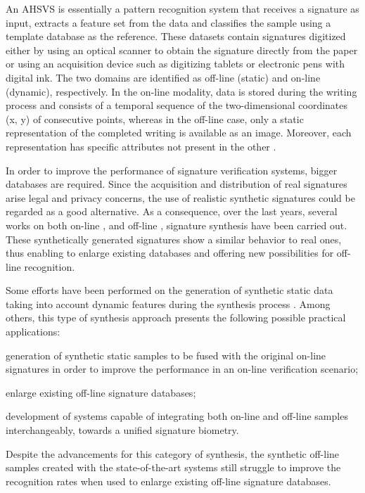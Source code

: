 An AHSVS is essentially a pattern recognition system that receives a signature as input, extracts a feature set from the data and classifies the sample using a template database as the reference. These datasets contain signatures digitized either by using an optical scanner to obtain the signature directly from the paper or using an acquisition device such as digitizing tablets or electronic pens with digital ink. The two domains are identified as off-line (static) and on-line (dynamic), respectively.  In the on-line modality, data is stored during the writing process and consists of a temporal sequence of the two-dimensional coordinates (x, y) of consecutive points, whereas in the off-line case, only a static representation of the completed writing is available as an image. Moreover, each representation has specific attributes not present in the other \cite{viard1999ireste}. 

In order to improve the performance of signature verification systems, bigger databases are required. Since the acquisition and distribution of real signatures arise legal and privacy concerns, the use of realistic synthetic signatures could be regarded as a good alternative. As a consequence, over the last years, several works on both on-line \cite{galbally2009synthetic}, \cite{galbally2012synthetic} and off-line \cite{ferrer2013synthetic}, \cite{ferrer2013realistic} signature synthesis have been carried out. These synthetically generated signatures show a similar behavior to real ones, thus enabling to enlarge existing databases and offering new possibilities for off-line recognition.

Some efforts have been performed on the generation of synthetic static data taking into account dynamic features during the synthesis process \cite{diaz2014generation}. Among others, this type of synthesis approach presents the following possible practical applications:
\begin{inlinelist}
  \item generation of synthetic static samples to be fused with the original on-line signatures in order to improve the performance in an on-line verification scenario;
  \item enlarge existing off-line signature databases;
  \item development of systems capable of integrating both on-line and off-line samples interchangeably, towards a unified signature biometry.
\end{inlinelist}

Despite the advancements for this category of synthesis, the synthetic off-line samples created with the state-of-the-art systems still struggle to improve the recognition rates when used to enlarge existing off-line signature databases.

